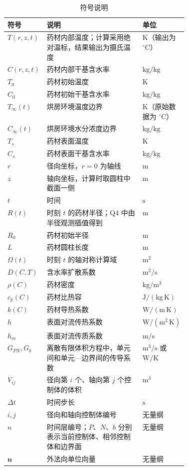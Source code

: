 \documentclass[withoutpreface,bwprint]{cumcmthesis}
\begin{document}
\begin{table}[H]
\centering
\caption{符号说明}
\label{tab:symbols}
\renewcommand{\arraystretch}{1.22}
\begin{tabularx}{0.96\linewidth}{>{\centering\arraybackslash}p{0.20\linewidth}X>{\centering\arraybackslash}p{0.22\linewidth}}
\toprule
符号 & 说明 & 单位 \\
\midrule
$T(r,z,t)$ & 药材内部温度；计算采用绝对温标，结果输出为摄氏温度 & $\mathrm{K}$（输出为 $^\circ\mathrm{C}$） \\
$C(r,z,t)$ & 药材内部干基含水率 & $\mathrm{kg/kg}$ \\
$T_0$ & 药材初始温度 & $\mathrm{K}$ \\
$C_0$ & 药材初始干基含水率 & $\mathrm{kg/kg}$ \\
$T_\infty(t)$ & 烘房环境温度边界 & $\mathrm{K}$（原始数据为 $^\circ\mathrm{C}$） \\
$C_\infty(t)$ & 烘房环境水分浓度边界 & $\mathrm{kg/kg}$ \\
$T_s$ & 药材表面温度 & $\mathrm{K}$ \\
$C_s$ & 药材表面干基含水率 & $\mathrm{kg/kg}$ \\
$r$ & 径向坐标，$r=0$ 为轴线 & $\mathrm{m}$ \\
$z$ & 轴向坐标，计算时取圆柱中截面一侧 & $\mathrm{m}$ \\
$t$ & 时间 & $\mathrm{s}$ \\
$R(t)$ & 时刻 $t$ 的药材半径；Q4 中由半径观测插值得到 & $\mathrm{m}$ \\
$R_0$ & 药材初始半径 & $\mathrm{m}$ \\
$L$ & 药材圆柱长度 & $\mathrm{m}$ \\
$\Omega(t)$ & 时刻 $t$ 的轴对称计算域 & $\mathrm{m^2}$ \\
$D(C,T)$ & 含水率扩散系数 & $\mathrm{m^2/s}$ \\
$\rho(C)$ & 药材密度 & $\mathrm{kg/m^3}$ \\
$c_p(C)$ & 药材比热容 & $\mathrm{J/(kg\,K)}$ \\
$k(C)$ & 药材导热系数 & $\mathrm{W/(m\,K)}$ \\
$h$ & 表面对流传热系数 & $\mathrm{W/(m^2\,K)}$ \\
$h_m$ & 表面对流传质系数 & $\mathrm{m/s}$ \\
$G_{PN},G_b$ & 离散有限体积方程中，单元间和单元—边界间的传导系数 & $\mathrm{m^3/s}$ 或 $\mathrm{W/K}$ \\
$V_{ij}$ & 径向第 $i$ 个、轴向第 $j$ 个控制体的体积 & $\mathrm{m^3}$ \\
$\Delta t$ & 时间步长 & $\mathrm{s}$ \\
$i,j$ & 径向和轴向控制体编号 & 无量纲 \\
$n$ & 时间层编号；$P$、$N$、$b$ 分别表示当前控制体、相邻控制体和边界面 & 无量纲 \\
$\boldsymbol{n}$ & 外法向单位向量 & 无量纲 \\
\bottomrule
\end{tabularx}
\end{table}
\end{document}
